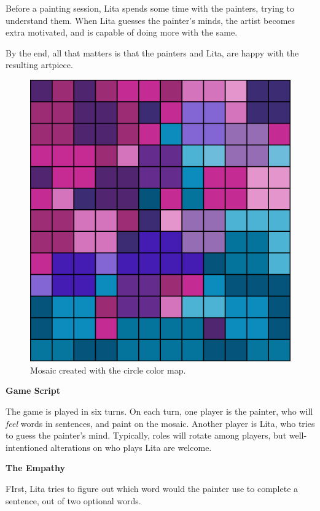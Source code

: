 \documentclass[twocolumn]{article}
\newcommand{\lvl}[1]{\vspace{0.5cm}\Large{\textbf{#1}}\vspace{0.2cm}}
\begin{document}
Before a painting session, Lita spends some time with the painters, trying to understand them. When Lita guesses the painter's minds, the artist becomes extra motivated, and is capable of doing more with the same. 

By the end, all that matters is that the painters and Lita, are happy with the resulting artpiece.

\newpage

\begin{figure}[t!]
\centering
\includegraphics[scale=0.23]{sario210222.png}
\caption{Mosaic created with the circle color map.}
\label{fig:mosaic_2}
\end{figure}


\lvl{Game Script}

The game is played in six turns. On each turn, one player is the painter, who will \textit{feel} words in sentences, and paint on the mosaic. Another player is Lita, who tries to guess the painter's mind. Typically, roles will rotate among players, but well-intentioned alterations on who plays Lita are welcome. 

\lvl{The Empathy}

FIrst, Lita tries to figure out which word would the painter use to complete a sentence, out of two optional words.
\end{document}
